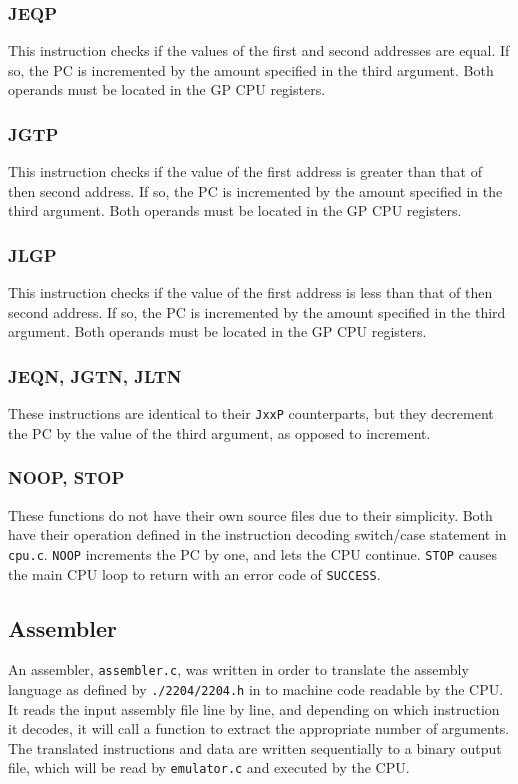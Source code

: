 \documentclass[a4paper,11pt]{article}
\begin{document}
        \subsubsection{JEQP}
            This instruction checks if the values of the first and second addresses are equal. If so, the PC is incremented by the amount specified in the third argument. Both operands must be located in the GP CPU registers.
            
        \subsubsection{JGTP}
            This instruction checks if the value of the first address is greater than that of then second address. If so, the PC is incremented by the amount specified in the third argument. Both operands must be located in the GP CPU registers.
            
        \subsubsection{JLGP}
            This instruction checks if the value of the first address is less than that of then second address. If so, the PC is incremented by the amount specified in the third argument. Both operands must be located in the GP CPU registers.
            
        \subsubsection{JEQN, JGTN, JLTN}
            These instructions are identical to their \lstinline{JxxP} counterparts, but they decrement the PC by the value of the third argument, as opposed to increment.
            
        \subsubsection{NOOP, STOP}
            These functions do not have their own source files due to their simplicity. Both have their operation defined in the instruction decoding switch/case statement in \lstinline{cpu.c}. \lstinline{NOOP} increments the PC by one, and lets the CPU continue. \lstinline{STOP} causes the main CPU loop to return with an error code of \lstinline{SUCCESS}.
            
    \subsection{Assembler}
        An assembler, \lstinline{assembler.c}, was written in order to translate the assembly language as defined by \lstinline{./2204/2204.h} in to machine code readable by the CPU. It reads the input assembly file line by line, and depending on which instruction it decodes, it will call a function to extract the appropriate number of arguments. The translated instructions and data are written sequentially to a binary output file, which will be read by \lstinline{emulator.c} and executed by the CPU.
    
\end{document}
